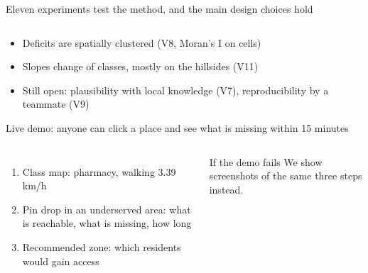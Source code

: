 \documentclass[aspectratio=169,10pt]{beamer}
\begin{document}
\begin{frame}{Eleven experiments test the method, and the main design choices hold}
  \vspace{4mm}
  \begin{columns}[T,onlytextwidth]
  \end{columns}
  \vspace{8mm}
  \begin{itemize}
    \item Deficits are spatially clustered (V8, Moran's I \factVEightMoran{} on cells)
    \item Slopes change \factVElevenChange{} of classes, mostly on the hillsides (V11)
    \item Still open: plausibility with local knowledge (V7), reproducibility by a teammate (V9)
  \end{itemize}
\end{frame}

\begin{frame}{Live demo: anyone can click a place and see what is missing within 15 minutes}
  \begin{columns}[T,onlytextwidth]
      \begin{enumerate}
        \item Class map: pharmacy, walking 3.39\,km/h
        \item Pin drop in an underserved area: what is reachable, what is missing, how long
        \item Recommended zone: which residents would gain access
      \end{enumerate}
      \begin{block}{If the demo fails}
        \footnotesize We show screenshots of the same three steps instead.
      \end{block}
  \end{columns}
\end{frame}

\end{document}

